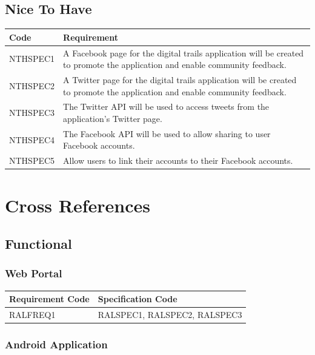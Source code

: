 \documentclass[11pt,a4paper]{article}
\begin{document}
\subsection{Nice To Have}

\begin{longtable}{|p{2.5cm}p{13cm}|}
\hline
\textbf{Code} & \textbf{Requirement} \\

\hline
NTHSPEC1 & A Facebook page for the digital trails application will be created to promote the application and enable community feedback. \\ \hline
NTHSPEC2 &  A Twitter page for the digital trails application will be created to promote the application and enable community feedback. \\ \hline
NTHSPEC3 & The Twitter API will be used to access tweets from the application's Twitter page. \\ \hline
NTHSPEC4 & The Facebook API will be used to allow sharing to user Facebook accounts. \\ \hline
NTHSPEC5 & Allow users to link their accounts to their Facebook accounts. \\ \hline
\end{longtable}


\section{Cross References}
\label{sec:cross-refs}

\subsection{Functional}

\subsubsection{Web Portal}

\begin{longtable}{|p{2.7cm}|p{10cm}|}
\hline
\textbf{Requirement Code} & \textbf{Specification Code} \\

\hline \hline RALFREQ1 & RALSPEC1, RALSPEC2, RALSPEC3  \\
\hline 
\end{longtable}


\subsubsection{Android Application}
\end{document}
